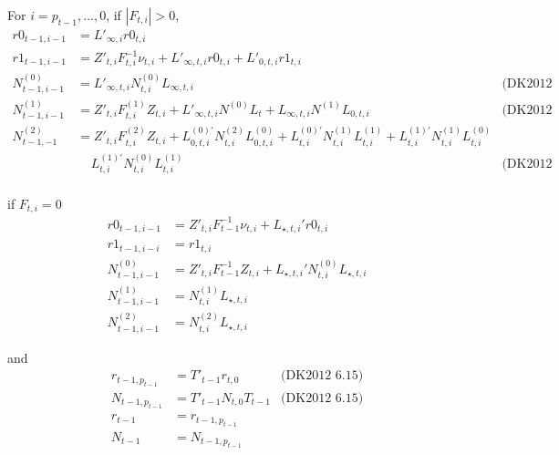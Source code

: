 \documentclass{article}
\begin{document}
For $i = p_{t-1},\ldots,0$, if $|F_{t,i}| > 0$,
\begin{align*}  
  r0_{t-1,i-1} &= L'_{\infty,i}r0_{t,i} \\
  r1_{t-1,i-1} &= Z'_{t,i}F^{-1}_{t,i}\nu_{t,i} +
                 L'_{\infty,t,i}r0_{t,i} + L'_{0,t,i}r1_{t,i} \\
  N^{(0)}_{t-1,i-1} &= L'_{\infty,t,i}N^{(0)}_{t,i}L_{\infty,t,i} & \mbox{(DK2012 5.26)}\\
  N^{(1)}_{t-1,i-1} &= Z'_{t,i}F^{(1)}_{t,i}Z_{t,i} + L'_{\infty,t,i}N^{(0)}L_t
                  +L_{\infty,t,i}N^{(1)}L_{0,t,i}
                  & \mbox{(DK2012 5.29)}\\
  N^{(2)}_{t-1,-1} &= Z'_{t,i}F^{(2)}_{t,i}Z_{t,i} + L^{(0)'}_{0,t,i}N^{(2)}_{t,i}L^{(0)}_{0,t,i} +
                  L^{(0)'}_{t,i}N^{(1)}_{t,i}L^{(1)}_{t,i} +
                  L^{(1)'}_{t,i}N^{(1)}_{t,i}L^{(0)}_{t,i} \\
  &\;\;\;\;  L^{(1)'}_{t,i}N^{(0)}_{t,i}L^{(1)}_{t,i} & \mbox{(DK2012 5.29)}\\
\end{align*}

if $F_{t,i} = 0$
\begin{align*}
  r0_{t-1,i-1} &= Z'_{t,i}F^{-1}_{t-1}\nu_{t,i} + L_{\star, t, i}'r0_{t,i} \\
  r1_{t-1,i-i} &= r1_{t,i}\\
  N^{(0)}_{t-1,i-1} &= Z'_{t,i}F^{-1}_{t-1}Z_{t,i} + L_{\star, t, i}'N^{(0)}_{t,i}L_{\star, t, i}\\
  N^{(1)}_{t-1,i-1} &= N^{(1)}_{t,i}L_{\star, t, i}\\
  N^{(2)}_{t-1,i-1} &= N^{(2)}_{t,i}L_{\star, t, i}
\end{align*}

and
\begin{align*}
  r_{t-1,p_{t-1}} &= T'_{t-1}r_{t,0} & \mbox{(DK2012 6.15)}\\
  N_{t-1,p_{t-1}} &= T'_{t-1}N_{t,0}T_{t-1}  & \mbox{(DK2012 6.15)}\\
  r_{t-1} &= r_{t-1, p_{t-1}}\\
  N_{t-1} &= N_{t-1, p_{t-1}}\\
\end{align*}
\end{document}
